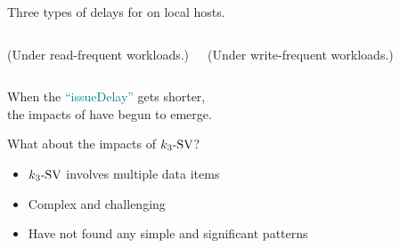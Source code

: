 \begin{frame}{}
  \centerline{Three types of delays for  on local hosts.}
  \begin{center}
    
  \end{center}

  
\end{frame}

\begin{frame}{}
  \begin{columns}
      \vspace{-0.40cm}
      \centerline{\footnotesize (Under read-frequent workloads.)}
      \vspace{-0.40cm}
      \centerline{\footnotesize (Under write-frequent workloads.)}
  \end{columns}

  \vspace{0.40cm}
  \begin{center}
    When the \textcolor{teal}{``issueDelay''} gets shorter, \\
    the impacts of \red{$\konebv$} have begun to emerge.
  \end{center}
\end{frame}

\begin{frame}{}
  What about the impacts of $k_3\text{-SV}$?
  \begin{itemize}
    \item $k_3\text{-SV}$ involves multiple data items
    \item Complex and challenging
    \item Have not found any simple and significant patterns
  \end{itemize}

% 
\end{frame}
